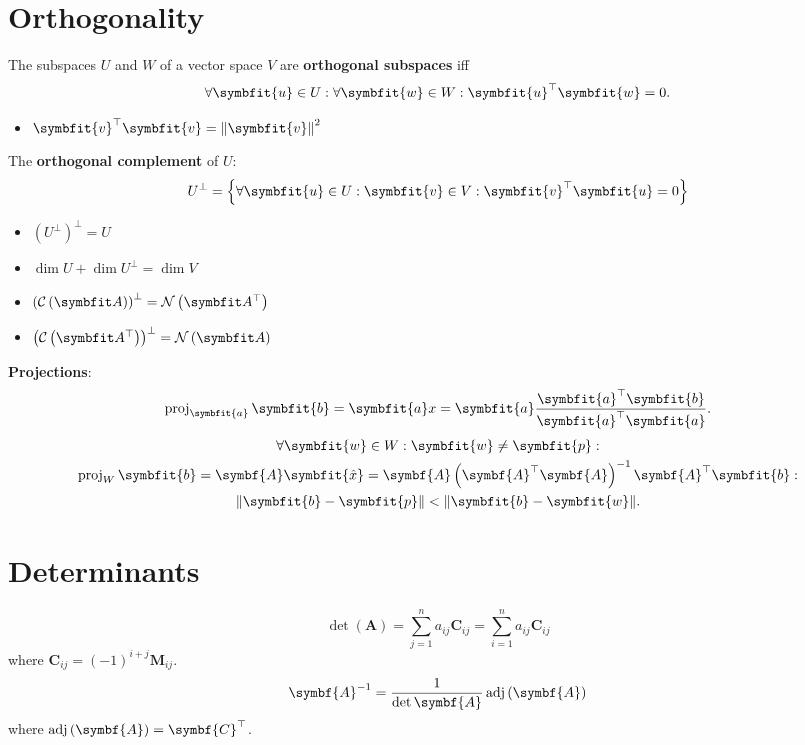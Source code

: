\documentclass{article}
\begin{document}
\begin{minipage}[t]{62.39259259mm}
    \section*{Orthogonality}
    The subspaces \(U\) and \(W\) of a vector space \(V\) are
    \textbf{orthogonal subspaces} iff
    \begin{equation*}
        \forall \symbfit{u}\in U:\forall \symbfit{w}\in W:\symbfit{u}^{\top}\symbfit{w} = 0.
    \end{equation*}
    \begin{itemize}
        \item \(\symbfit{v}^\top \symbfit{v}=\norm{\symbfit{v}}^2\)
    \end{itemize}
    The \textbf{orthogonal complement} of \(U\):
    \begin{equation*}
        U^{\perp} = \left\{ \forall \symbfit{u}\in U:\symbfit{v}\in V: \symbfit{v}^{\top}\symbfit{u}=0 \right\}
    \end{equation*}
    \begin{itemize}
        \item \(\left( U^{\perp} \right)^{\perp} = U\)
        \item \(\dim{U} + \dim{U^{\perp}} = \dim{V}\)
        \item \(\left( \columnspace{A} \right)^\perp = \leftnullspace{A}\)
        \item \(\left( \rowspace{A} \right)^\perp = \nullspace{A}\)
    \end{itemize}
    \textbf{Projections}:
    \begin{equation*}
        \proj_{\symbfit{a}}\symbfit{b}
        = \symbfit{a} x
        = \symbfit{a} \frac{\symbfit{a}^\top \symbfit{b}}{\symbfit{a}^\top \symbfit{a}}.
    \end{equation*}
    \begin{gather*}
        \forall \symbfit{w}\in W:\symbfit{w}\neq \symbfit{p}: \\
        \proj_{W}\symbfit{b} = \symbf{A}\symbfit{\hat{x}} = \symbf{A}\left( \symbf{A}^\top \symbf{A} \right)^{-1}\symbf{A}^\top \symbfit{b}: \\
        \norm{\symbfit{b}-\symbfit{p}}<\norm{\symbfit{b}-\symbfit{w}}.
    \end{gather*}
    \section*{Determinants}
    \begin{equation*}
        \det{\left( \symbf{A} \right)} = \sum_{j=1}^n a_{ij}\symbf{C}_{ij} = \sum_{i=1}^n a_{ij}\symbf{C}_{ij}
    \end{equation*}
    where \(\symbf{C}_{ij}=\left( -1 \right)^{i+j}\symbf{M}_{ij}\).
    \begin{equation*}
        \symbf{A}^{-1}=\frac{1}{\det{\symbf{A}}} \adj{\left( \symbf{A} \right)}
    \end{equation*}
    where \(\adj{\left( \symbf{A} \right)}=\symbf{C}^\top\).
\end{minipage}\hfill%
\end{document}
